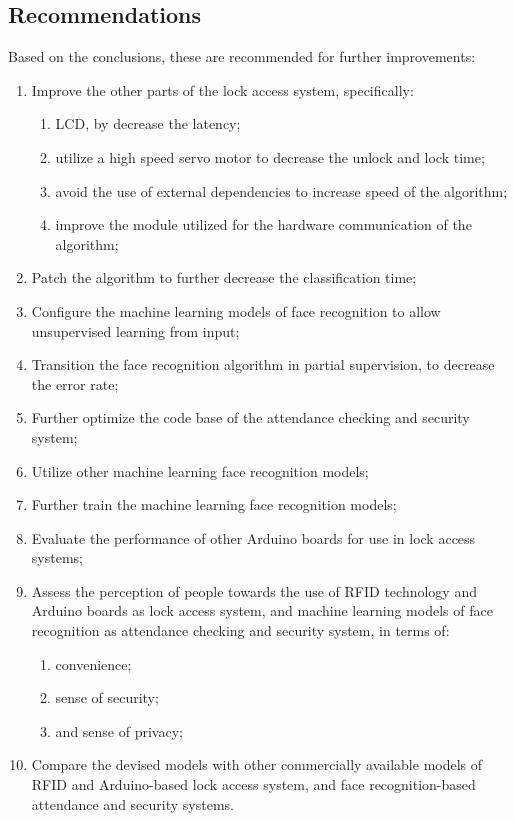 \documentclass[12pt]{article}
\begin{document}
\subsection*{Recommendations\centering}

Based on the conclusions, these are recommended for further improvements:

\begin{enumerate}
	\item Improve the other parts of the lock access system, specifically:
	\begin{enumerate}
		\item LCD, by decrease the latency;
		\item utilize a high speed servo motor to decrease the unlock and lock time;
		\item avoid the use of external dependencies to increase speed of the algorithm;
		\item improve the module utilized for the hardware communication of the algorithm;
	\end{enumerate}
	\item Patch the algorithm to further decrease the classification time;
	\item Configure the machine learning models of face recognition to allow unsupervised learning from input;
	\item Transition the face recognition algorithm in partial supervision, to decrease the error rate;
	\item Further optimize the code base of the attendance checking and security system;
	\item Utilize other machine learning face recognition models;
	\item Further train the machine learning face recognition models;
	\item Evaluate the performance of other Arduino boards for use in lock access systems;
	\item Assess the perception of people towards the use of RFID technology and Arduino boards as lock access system, and machine learning models of face recognition as attendance checking and security system, in terms of:
	\begin{enumerate}
		\item convenience;
		\item sense of security;
		\item and sense of privacy;
	\end{enumerate}
	\item Compare the devised models with other commercially available models of RFID and Arduino-based lock access system, and face recognition-based attendance and security systems.
\end{enumerate}
\end{document}
